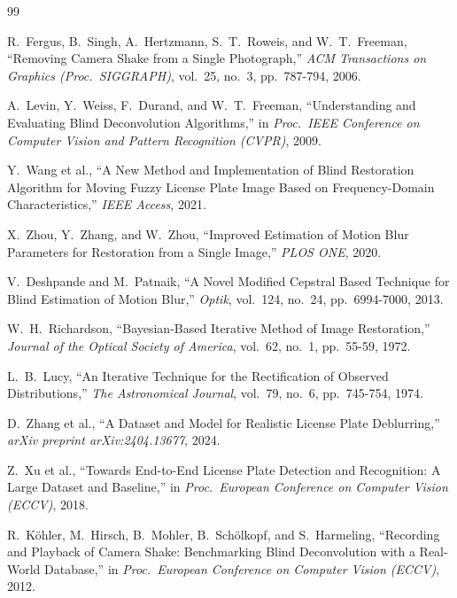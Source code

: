 \documentclass[11pt,a4paper]{article}
\begin{document}
\begin{thebibliography}{99}

R.~Fergus, B.~Singh, A.~Hertzmann, S.~T.~Roweis, and W.~T.~Freeman,
``Removing Camera Shake from a Single Photograph,''
\emph{ACM Transactions on Graphics (Proc.\ SIGGRAPH)}, vol.~25, no.~3, pp.~787-794, 2006.

A.~Levin, Y.~Weiss, F.~Durand, and W.~T.~Freeman,
``Understanding and Evaluating Blind Deconvolution Algorithms,''
in \emph{Proc.\ IEEE Conference on Computer Vision and Pattern Recognition (CVPR)}, 2009.

Y.~Wang et al.,
``A New Method and Implementation of Blind Restoration Algorithm for Moving Fuzzy
License Plate Image Based on Frequency-Domain Characteristics,''
\emph{IEEE Access}, 2021.

X.~Zhou, Y.~Zhang, and W.~Zhou,
``Improved Estimation of Motion Blur Parameters for Restoration from a Single Image,''
\emph{PLOS ONE}, 2020.

V.~Deshpande and M.~Patnaik,
``A Novel Modified Cepstral Based Technique for Blind Estimation of Motion Blur,''
\emph{Optik}, vol.~124, no.~24, pp.~6994-7000, 2013.

W.~H.~Richardson,
``Bayesian-Based Iterative Method of Image Restoration,''
\emph{Journal of the Optical Society of America}, vol.~62, no.~1, pp.~55-59, 1972.

L.~B.~Lucy,
``An Iterative Technique for the Rectification of Observed Distributions,''
\emph{The Astronomical Journal}, vol.~79, no.~6, pp.~745-754, 1974.

D.~Zhang et al.,
``A Dataset and Model for Realistic License Plate Deblurring,''
\emph{arXiv preprint arXiv:2404.13677}, 2024.

Z.~Xu et al.,
``Towards End-to-End License Plate Detection and Recognition: A Large Dataset and
Baseline,''
in \emph{Proc.\ European Conference on Computer Vision (ECCV)}, 2018.

R.~Köhler, M.~Hirsch, B.~Mohler, B.~Schölkopf, and S.~Harmeling,
``Recording and Playback of Camera Shake: Benchmarking Blind Deconvolution with a
Real-World Database,''
in \emph{Proc.\ European Conference on Computer Vision (ECCV)}, 2012.

\end{thebibliography}
\end{document}
